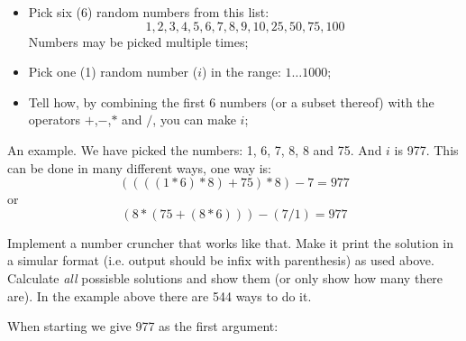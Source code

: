 \begin{Exercise}[title={Number cruncher},difficulty=9]
\label{ex:numbercruncher}
\begin{itemize}
\item{Pick six (6) random numbers from this list:
$$1, 2, 3, 4, 5, 6, 7, 8, 9, 10, 25, 50, 75, 100$$
Numbers may be picked multiple times;}
\item{Pick one (1) random number ($i$) in the range: $1 \ldots 1000$;}
\item{Tell how, by combining the first 6 numbers (or a subset thereof)
with the operators $+$,$-$,$*$ and $/$, you can make $i$;}
\end{itemize}
An example. We have picked the numbers: 1, 6, 7, 8, 8 and 75. And $i$ is
977. This can be done in many different ways, one way is:
$$ ((((1 * 6) * 8) + 75) * 8) - 7 = 977$$ 
or
$$ (8*(75+(8*6)))-(7/1) = 977$$

\Question\label{ex:cruncher q1}
Implement a number cruncher that works like that. Make it print the
solution in a simular format (i.e. output should be infix with
parenthesis) as used above.
\Question\label{ex:cruncher q2}
Calculate \emph{all} possisble solutions and show them (or only show how
many there are). In the example above there are 544 ways to do it.
\end{Exercise}

\begin{Answer}
\Question 


\Question
When starting  we give 977 as the first argument:
\vspace{1em}

\end{Answer}

